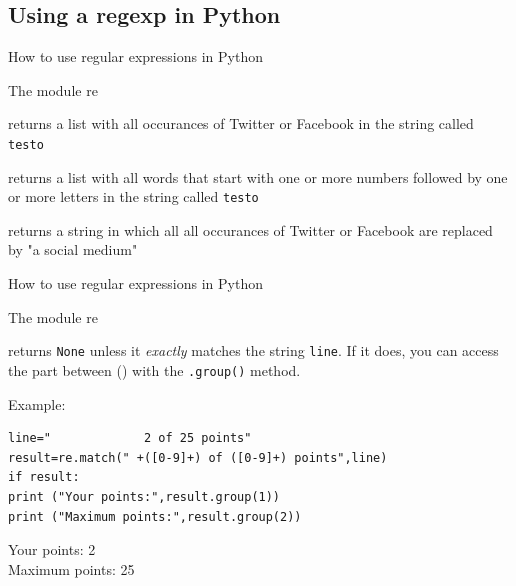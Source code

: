 \documentclass{beamer}
\begin{document}
\subsection{Using a regexp in Python}
\begin{frame}{How to use regular expressions in Python}
\begin{block}{The module re}
\begin{description}
\item<1->[{\tt{re.findall("\lbrack Tt\rbrack witter|\lbrack Ff\rbrack acebook",testo)}}] returns a list with all occurances of Twitter or Facebook in the string called {\tt{testo}}
\item<1->[{\tt{re.findall("\lbrack 0-9\rbrack +\lbrack a-zA-Z\rbrack +",testo)}}] returns a list with all words that start with one or more numbers followed by one or more letters in the string called {\tt{testo}}
\item<2->[{\tt{re.sub("\lbrack Tt\rbrack witter|\lbrack Ff\rbrack acebook","a social medium",testo)}}] returns a string in which all all occurances of Twitter or Facebook are replaced by "a social medium"
\end{description}
\end{block}
\end{frame}


\begin{frame}[fragile]{How to use regular expressions in Python}
\begin{block}{The module re}
\begin{description}
\item<1->[{\tt{re.match(" +(\lbrack 0-9\rbrack +) of (\lbrack 0-9\rbrack +) points",line)}}] returns  \texttt{None} unless it \emph{exactly} matches the string \texttt{line}. If it does, you can access the part between () with the \texttt{.group()} method.
\end{description}
\end{block}

Example:
\begin{lstlisting}
line="             2 of 25 points"
result=re.match(" +([0-9]+) of ([0-9]+) points",line)
if result:
print ("Your points:",result.group(1))
print ("Maximum points:",result.group(2))
\end{lstlisting}
Your points: 2\\
Maximum points: 25
\end{frame}
\end{document}
